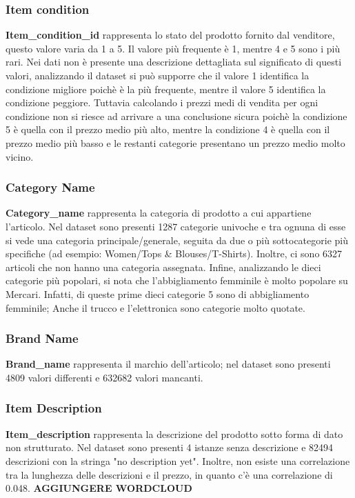 \subsubsection{Item condition}
\textbf{Item\_condition\_id} rappresenta lo stato del prodotto fornito dal venditore, questo valore varia da 1 a 5.
Il valore più frequente è 1, mentre 4 e 5 sono i più rari. Nei dati non è presente una descrizione dettagliata sul significato di questi valori, analizzando il dataset si può supporre che il valore 1 identifica la condizione migliore poichè è la più frequente, mentre il valore 5 identifica la condizione peggiore. Tuttavia calcolando i prezzi medi di vendita per ogni condizione non si riesce ad arrivare a una conclusione sicura poichè la condizione 5 è quella con il prezzo medio più alto, mentre la condizione 4 è quella con il prezzo medio più basso e le restanti categorie presentano un prezzo medio molto vicino.
\subsubsection{Category Name}
\textbf{Category\_name} rappresenta la categoria di prodotto a cui appartiene l'articolo.
Nel dataset sono presenti 1287 categorie univoche e tra ognuna di esse si vede una categoria principale/generale, seguita da due o più sottocategorie più specifiche (ad esempio: Women/Tops \& Blouses/T-Shirts). Inoltre, ci sono 6327 articoli che non hanno una categoria assegnata.
Infine, analizzando le dieci categorie più popolari, si nota che l'abbigliamento femminile è molto popolare su Mercari. Infatti, di queste prime dieci categorie 5 sono di abbigliamento femminile; Anche il trucco e l'elettronica sono categorie molto quotate.
\subsubsection{Brand Name}
\textbf{Brand\_name} rappresenta il marchio dell'articolo; nel dataset sono presenti 4809 valori differenti e 632682 valori mancanti.
\subsubsection{Item Description}
\textbf{Item\_description} rappresenta la descrizione del prodotto sotto forma di dato non strutturato. Nel dataset sono presenti 4 istanze senza descrizione e 82494 descrizioni con la stringa "no description yet".
Inoltre, non esiste una correlazione tra la lunghezza delle descrizioni e il prezzo, in quanto c'è una correlazione di 0.048.
\textbf{AGGIUNGERE WORDCLOUD}